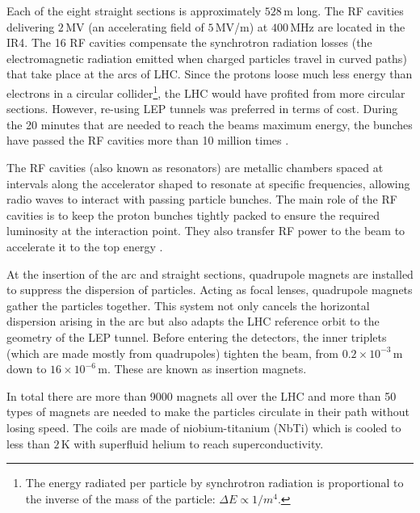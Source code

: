 Each of the eight straight sections is approximately $528\,$m long. The RF cavities delivering
$2\,$MV (an accelerating field of $5\,$MV/m) at $400\,$MHz are located in the IR4. 
The 16 RF cavities compensate the synchrotron radiation
losses (the electromagnetic radiation emitted when charged particles travel in curved paths) that
take place at the arcs of LHC.
Since the protons loose much less energy than electrons in a circular collider\footnote{The
energy radiated per particle by synchrotron radiation is proportional to the 
inverse of the mass of the particle: $\Delta E \propto 1/m^4$. }, the LHC would have
profited from more circular sections. However, re-using LEP tunnels was preferred in terms of cost.
During the 20 minutes that are needed to reach the beams maximum energy,
the bunches have passed the RF cavities more than 10 million times \cite{Pettersson:291782}.

The RF cavities (also known as resonators) are metallic chambers spaced at intervals along the accelerator shaped to resonate at 
specific frequencies, allowing radio waves to interact with passing particle bunches. The main role of
the RF cavities is to keep the proton bunches tightly packed to ensure the required luminosity at
the interaction point. They also transfer RF power to the beam to accelerate it to the top energy \cite{Radiofrequency:1997424}.

At the insertion of the arc and straight sections, quadrupole magnets are installed to suppress
the dispersion of particles. Acting as focal lenses, quadrupole magnets gather the particles 
together.  This system not only cancels the horizontal dispersion arising in the arc but also
adapts the LHC reference orbit to the geometry of the LEP tunnel. 
Before entering the detectors, the inner triplets (which are made mostly from quadrupoles)
tighten the beam, from $0.2\times 10^{-3}\,$m  down to $16\times 10^{-6}\,$m. These are known as insertion magnets.

In total there are more than 9000 magnets all over the LHC and more than 50 types of magnets are needed to
 make the particles circulate in their path without losing speed.
The coils are made of niobium-titanium (NbTi)  which is cooled to less than $2\,$K with superfluid helium to reach superconductivity. 

\begin{comment}
Of course, only stable charge particles\footnote{Long-lived particles such as the muon ($\tau \approx 2\times10^{-6}$ s) are discussed to be 
used on a muon collider \cite{Long:2020wfp}.} such as electrons, positrons, protons, antiprotons and some ions, can be accelerated by
the magnetic fields described. The force that experiments a charged particle with charge $q$ moving under a magnetic field $B$ at
a speed $v$ is given by Lorentz law
\begin{equation}
	\overrightarrow{F} = q \overrightarrow{v} \times \overrightarrow{B}
\end{equation}
and, since $\overrightarrow{B}$ is perpendicular to $\overrightarrow{v}$, this force is always directed to the centre of the circle of radius $r$:  $F = Bqv = m\frac{v^2}{r}$.
\end{comment}


